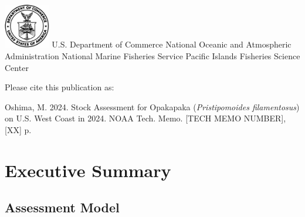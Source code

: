 \documentclass[
]{scrartcl}
\renewcommand*\contentsname{Table of contents}
\newcommand\contentsname{Table of contents}
\begin{document}
\begin{titlepage}
\begin{minipage}[b][\textheight][s]{\textwidth}
  \vspace{1\baselineskip}



  \vfill


  \vspace{1\baselineskip}

  \includegraphics[alt={},width=2cm]{support_files/us_doc_logo.png}\newline %
  U.S. Department of Commerce\newline
  National Oceanic and Atmospheric Administration\newline
  National Marine Fisheries Service\newline
  Pacific Islands Fisheries Science Center\newline

  \end{minipage}
  \restoregeometry
  \end{titlepage}

\renewcommand*\contentsname{Table of contents}
{
\hypersetup{linkcolor=.}
\setcounter{tocdepth}{3}
\tableofcontents
}
\listoffigures
\listoftables

\newpage{}

Please cite this publication as:

Oshima, M. 2024. Stock Assessment for Opakapaka
(\textit{Pristipomoides filamentosus}) on U.S. West Coast in 2024. NOAA
Tech. Memo. {[}TECH MEMO NUMBER{]}, {[}XX{]} p.~

\newpage{}

\section{Executive Summary}\label{sec-exec-sum}

\subsection{Assessment Model}\label{assessment-model}
\end{document}
